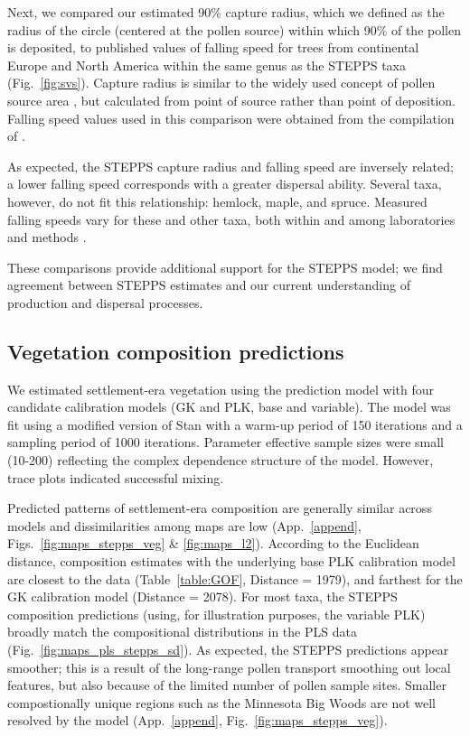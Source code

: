 \documentclass[12pt]{article}
\begin{document}
Next, we compared our estimated 90\% capture radius, which we defined
as the radius of the circle (centered at the pollen source) within
which 90\% of the pollen is deposited, to published values of falling
speed for trees from continental Europe and North America within the
same genus as the STEPPS taxa (Fig.~\ref{fig:svs}). Capture radius
is similar to the widely used concept of pollen source area
\citep{sugita1994pollen}, but calculated from point of source rather
than point of deposition. Falling speed values used in this comparison
were obtained from the compilation of \citet{jackson1999pollen}.

As expected, the STEPPS capture radius and falling speed are inversely
related; a lower falling speed corresponds with a greater dispersal
ability. Several taxa, however, do not fit this relationship: hemlock,
maple, and spruce. Measured falling speeds vary for these and other
taxa, both within and among laboratories and methods
\citep{jackson1999pollen}.

These comparisons provide additional support for the STEPPS model; we
find agreement between STEPPS estimates and our current understanding
of production and dispersal processes.

\subsection{Vegetation composition predictions}

We estimated settlement-era vegetation using the prediction model with
four candidate calibration models (GK and PLK, base and variable). The
model was fit using a modified version of Stan with a warm-up period
of 150 iterations and a sampling period of 1000 iterations. Parameter
effective sample sizes were small (10-200) reflecting the complex
dependence structure of the model. However, trace plots indicated
successful mixing.
                                                                                  
Predicted patterns of settlement-era composition are generally similar
across models and dissimilarities among maps are low
(App.~\ref{append}, Figs.~\ref{fig:maps_stepps_veg} \&
\ref{fig:maps_l2}). According to the Euclidean distance, composition
estimates with the underlying base PLK calibration model are closest
to the data (Table~\ref{table:GOF}, Distance = 1979), and farthest for
the GK calibration model (Distance = 2078).  For most taxa, the STEPPS
composition predictions (using, for illustration purposes, the
variable PLK) broadly match the compositional distributions in the PLS
data (Fig.~\ref{fig:maps_pls_stepps_sd}). As expected, the STEPPS
predictions appear smoother; this is a result of the long-range pollen
transport smoothing out local features, but also because of the
limited number of pollen sample sites. Smaller compostionally unique
regions such as the Minnesota Big Woods are not well resolved by the
model (App.~\ref{append}, Fig.~\ref{fig:maps_stepps_veg}).
\end{document}
